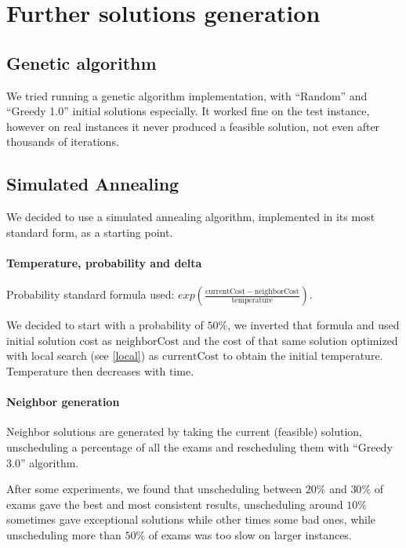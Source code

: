 \documentclass[11pt, a4paper, leqno]{article}
\begin{document}
	\section{Further solutions generation}
	
	\subsection{Genetic algorithm}
	We tried running a genetic algorithm implementation, with ``Random'' and ``Greedy 1.0'' initial solutions especially. It worked fine on the test instance, however on real instances it never produced a feasible solution, not even after thousands of iterations.
	
	\subsection{Simulated Annealing}
	
	We decided to use a simulated annealing algorithm, implemented in its most standard form, as a starting point.
	
	\paragraph{Temperature, probability and delta}
	
	Probability standard formula used: $exp\left(\frac{\mathrm{currentCost}-\mathrm{neighborCost}}{\mathrm{temperature}}\right)$.
	
	We decided to start with a probability of $50\%$, we inverted that formula and used initial solution cost as $\mathrm{neighborCost}$ and the cost of that same solution optimized with local search (see \ref{local}) as $\mathrm{currentCost}$ to obtain the initial temperature. Temperature then decreases with time.
	
	\paragraph{Neighbor generation}
	\label{neighbors}
	
	Neighbor solutions are generated by taking the current (feasible) solution, unscheduling a percentage of all the exams and rescheduling them with ``Greedy 3.0'' algorithm.
	
	After some experiments, we found that unscheduling between $20\%$ and $30\%$ of exams gave the best and most consistent results, unscheduling around $10\%$ sometimes gave exceptional solutions while other times some bad ones, while unscheduling more than $50\%$ of exams was too slow on larger instances.
	
\end{document}
